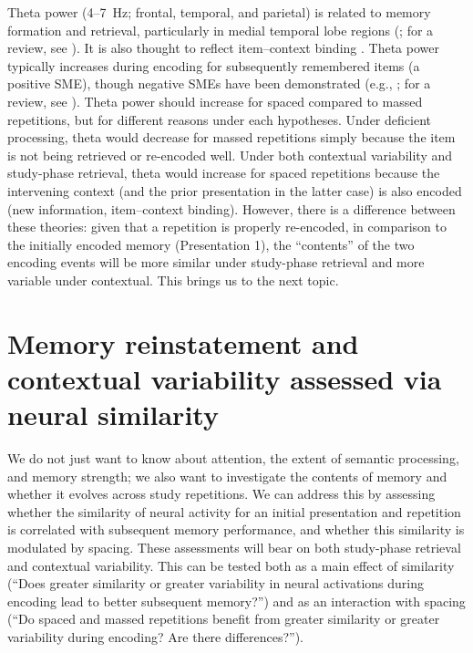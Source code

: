 
Theta power (4--7~Hz; frontal, temporal, and parietal) is related to memory formation and retrieval, particularly in medial temporal lobe regions (; for a review, see ).  It is also thought to reflect item--context binding \cite{HansEtal2009a,HansEtal2011a,StauHans2013,SummMang2005}.  Theta power typically increases during encoding for subsequently remembered items (a positive SME), though negative SMEs have been demonstrated (e.g., ; for a review, see ).  Theta power should increase for spaced compared to massed repetitions, but for different reasons under each hypotheses.  Under deficient processing, theta would decrease for massed repetitions simply because the item is not being retrieved or re-encoded well.
Under both contextual variability and study-phase retrieval, theta would increase for spaced repetitions because the intervening context (and the prior presentation in the latter case) is also encoded (new information, item--context binding).
However, there is a difference between these theories: given that a repetition is properly re-encoded, in comparison to the initially encoded memory (Presentation 1), the ``contents'' of the two encoding events will be more similar under study-phase retrieval and more variable under contextual.  This brings us to the next topic.




\section{Memory reinstatement and contextual variability assessed via neural similarity}

We do not just want to know about attention, the extent of semantic processing, and memory strength; we also want to investigate the contents of memory and whether it evolves across study repetitions.
We can address this by assessing whether the similarity of neural activity for an initial presentation and repetition is correlated with subsequent memory performance, and whether this similarity is modulated by spacing.  These assessments will bear on both study-phase retrieval and contextual variability.  This can be tested both as a main effect of similarity (``Does greater similarity or greater variability in neural activations during encoding lead to better subsequent memory?'') and as an interaction with spacing (``Do spaced and massed repetitions benefit from greater similarity or greater variability during encoding?  Are there differences?'').

